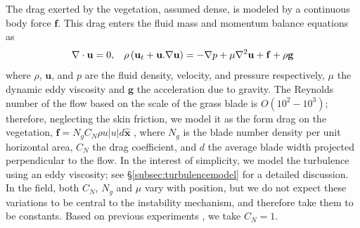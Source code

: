 \documentclass{jfm}
\newcommand{\bx}{{\boldsymbol{\hat{x}}}}
\newcommand{\bu}{\mathbf{u}}
\newcommand{\grad}{\mathbf{\nabla}}
\begin{document}
The drag exerted by the vegetation, assumed dense, is modeled by a continuous body force $\mathbf{f}$.
This drag enters the fluid mass and momentum balance equations as 
\begin{equation}
\grad\cdot\bu = 0,\hspace{3mm} \rho \left(\bu_{t}+\bu.\grad\bu \right) = -\grad p+\mu\grad^{2}\bu +\mathbf{f}+\rho\mathbf{g}
\label{navier-stokes}
\end{equation}
where $\rho$, $\bu$, and $p$ are the fluid density, velocity, and pressure respectively, $\mu$ the dynamic eddy viscosity and $\mathbf{g}$ the acceleration due to gravity. 
The Reynolds number of the flow based on the scale of the grass blade is $O(10^2-10^3)$; therefore, neglecting the skin friction, we model it as the form drag on the vegetation, $\mathbf{f}=N_g C_N \rho u |u| d\bx$ \cite{Nepf99,Nepf00,Nepf04}, where  $N_g$ is the blade number density per unit horizontal area, $C_{N}$ the drag coefficient, and $d$ the average blade width projected perpendicular to the flow. 
In the interest of simplicity, we model the turbulence using an eddy viscosity; see \S\ref{subsec:turbulencemodel} for a detailed discussion. 
In the field, both $C_N$, $N_g$ and $\mu$ vary with position, but we do not expect these variations to be central to the instability mechanism, and therefore take them to be constants. 
Based on previous experiments \cite{Vivoni98,Nepf00}, we take $C_N = 1$.
\end{document}
